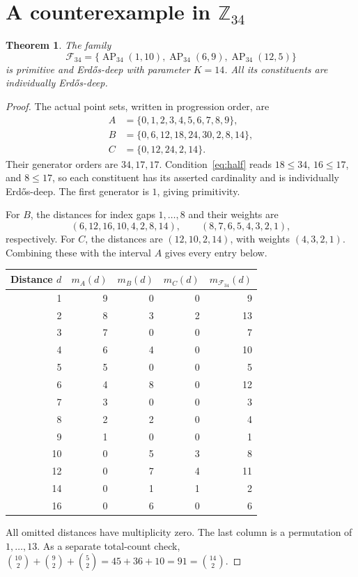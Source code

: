 \documentclass[11pt]{article}
\newtheorem{theorem}{Theorem}
\newcommand{\Z}{\mathbb Z}
\newcommand{\AP}{\operatorname{AP}}
\begin{document}
\section{A counterexample in $\Z_{34}$}
\begin{theorem}\label{thm:34}
The family
\[
 \mathcal F_{34}=\{\AP_{34}(1,10),\AP_{34}(6,9),\AP_{34}(12,5)\}
\]
is primitive and Erd\H{o}s-deep with parameter $K=14$.
All its constituents are individually Erd\H{o}s-deep.
\end{theorem}
\begin{proof}
The actual point sets, written in progression order, are
\begin{align*}
 A&=\{0,1,2,3,4,5,6,7,8,9\},\\
 B&=\{0,6,12,18,24,30,2,8,14\},\\
 C&=\{0,12,24,2,14\}.
\end{align*}
Their generator orders are $34,17,17$. Condition~\eqref{eq:half}
reads $18\le34$, $16\le17$, and $8\le17$, so each constituent has
its asserted cardinality and is individually Erd\H{o}s-deep.
The first generator is $1$, giving primitivity.

For $B$, the distances for index gaps $1,\ldots,8$ and their weights are
\[
 (6,12,16,10,4,2,8,14),\qquad (8,7,6,5,4,3,2,1),
\]
respectively.
For $C$, the distances are $(12,10,2,14)$, with weights $(4,3,2,1)$.
Combining these with the interval $A$ gives every entry below.
\begin{center}
\renewcommand{\arraystretch}{1.08}
\begin{tabular}{rrrrr}
\toprule
Distance $d$ & $m_A(d)$ & $m_B(d)$ & $m_C(d)$ & $m_{\mathcal F_{34}}(d)$\\
\midrule
1&9&0&0&9\\
2&8&3&2&13\\
3&7&0&0&7\\
4&6&4&0&10\\
5&5&0&0&5\\
6&4&8&0&12\\
7&3&0&0&3\\
8&2&2&0&4\\
9&1&0&0&1\\
10&0&5&3&8\\
12&0&7&4&11\\
14&0&1&1&2\\
16&0&6&0&6\\
\bottomrule
\end{tabular}
\end{center}
All omitted distances have multiplicity zero. The last column is a
permutation of $1,\ldots,13$. As a separate total-count check,
$\binom{10}{2}+\binom92+\binom52=45+36+10=91=\binom{14}{2}$.
\end{proof}
\end{document}
